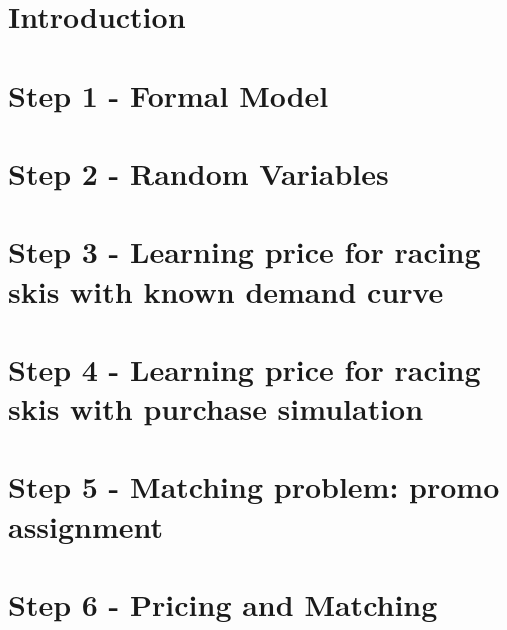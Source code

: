 


	
	\tableofcontents
    \clearpage
	\section*{Introduction}
    \label{sect:Introduction}
		
    \section*{Step 1 - Formal Model}
    \label{sect:Step 1 - Formal Model}
		
    \section*{Step 2 - Random Variables}
    \label{sect:Step 2 - Random Variables}
			
    \section*{Step 3 - Learning price for racing skis with known demand curve}
    \label{sect:Step 3 - Learning price for racing skis with known demand curve}
		
    \section*{Step 4 - Learning price for racing skis with purchase simulation}
    \label{sect:Step 4 - Learning price for racing skis with purchase simulation}
		
    \section*{Step 5 - Matching problem: promo assignment}
    \label{sect:Step 5 - Matching problem: promo assignment}
		
    \section*{Step 6 - Pricing and Matching}
    \label{sect:Step 6 - Pricing and Matching}
		
